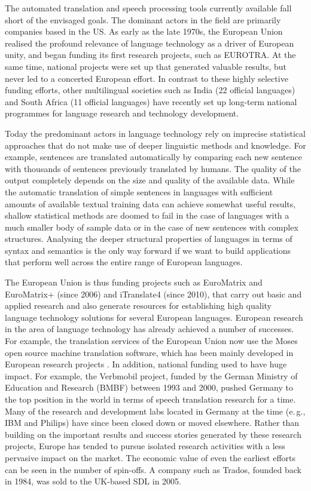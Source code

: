 \documentclass[10pt, plain]{../../metanetpaper}
\begin{document}
\begin{multicols}{2}
The automated translation and speech processing tools currently available fall short of the envisaged goals. The dominant actors in the field are primarily companies based in the US. As early as the late 1970s, the European Union realised the profound relevance of language technology as a driver of European unity, and began funding its first research projects, such as EUROTRA. At the same time, national projects were set up that generated valuable results, but never led to a concerted European effort. In contrast to these highly selective funding efforts, other multilingual societies such as India (22 official languages) and South Africa (11 official languages) have recently set up long-term national programmes for language research and technology development.

Today the predominant actors in language technology rely on imprecise statistical approaches that do not make use of deeper linguistic methods and knowledge. For example, sentences are translated automatically by comparing each new sentence with thousands of sentences previously translated by humans. The quality of the output completely depends on the size and quality of the available data. While the automatic translation of simple sentences in languages with sufficient amounts of available textual training data can achieve somewhat useful results, shallow statistical methods are doomed to fail in the case of languages with a much smaller body of sample data or in the case of new sentences with complex structures. Analysing the deeper structural properties of languages in terms of syntax and semantics is the only way forward if we want to build applications that perform well across the entire range of European languages.

The European Union is thus funding projects such as EuroMatrix and EuroMatrix+ (since 2006) and iTranslate4 (since 2010), that carry out basic and applied research and also generate resources for establishing high quality language technology solutions for several European languages. European research in the area of language technology has already achieved a number of successes. For example, the translation services of the European Union now use the Moses open source machine translation software, which has been mainly developed in European research projects \cite{moses}. In addition, national funding used to have huge impact. For example, the Verbmobil project, funded by the German Ministry of Education and Research (BMBF) between 1993 and 2000, pushed Germany to the top position in the world in terms of speech translation research for a time. Many of the research and development labs located in Germany at the time (e.\,g., IBM and Philips) have since been closed down or moved elsewhere. Rather than building on the important results and success stories generated by these research projects, Europe has tended to pursue isolated research activities with a less pervasive impact on the market. The economic value of even the earliest efforts can be seen in the number of spin-offs. A company such as Trados, founded back in 1984, was sold to the UK-based SDL in 2005.


\end{multicols}
\end{document}

